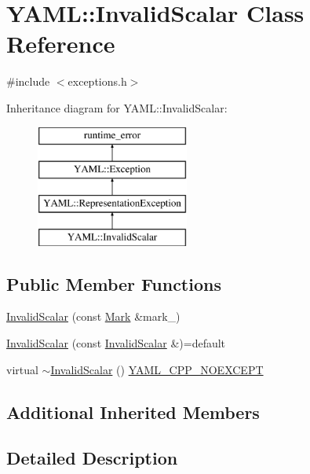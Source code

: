 \hypertarget{class_y_a_m_l_1_1_invalid_scalar}{}\section{Y\+A\+ML\+::Invalid\+Scalar Class Reference}
\label{class_y_a_m_l_1_1_invalid_scalar}


{\ttfamily \#include $<$exceptions.\+h$>$}

Inheritance diagram for Y\+A\+ML\+::Invalid\+Scalar\+:\begin{figure}[H]
\begin{center}
\leavevmode
\includegraphics[height=4.000000cm]{class_y_a_m_l_1_1_invalid_scalar}
\end{center}
\end{figure}
\subsection*{Public Member Functions}
\begin{DoxyCompactItemize}
\item 
\mbox{\hyperlink{class_y_a_m_l_1_1_invalid_scalar_a2a8fd52ce4e2ff82ec32f7e9a9557ef3}{Invalid\+Scalar}} (const \mbox{\hyperlink{struct_y_a_m_l_1_1_mark}{Mark}} \&mark\+\_\+)
\item 
\mbox{\hyperlink{class_y_a_m_l_1_1_invalid_scalar_a20d31dd3e10f8d84daa18bf69c8a5670}{Invalid\+Scalar}} (const \mbox{\hyperlink{class_y_a_m_l_1_1_invalid_scalar}{Invalid\+Scalar}} \&)=default
\item 
virtual \mbox{\hyperlink{class_y_a_m_l_1_1_invalid_scalar_a2fa46dc89152edbf6bf1bbccd019f74a}{$\sim$\+Invalid\+Scalar}} () \mbox{\hyperlink{exceptions_8cpp_a4ea58eb0a28000364858d4942add7d1a}{Y\+A\+M\+L\+\_\+\+C\+P\+P\+\_\+\+N\+O\+E\+X\+C\+E\+PT}}
\end{DoxyCompactItemize}
\subsection*{Additional Inherited Members}


\subsection{Detailed Description}


